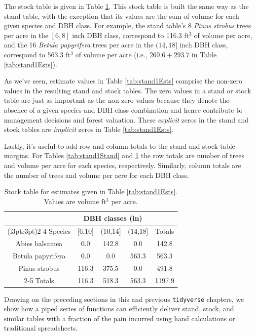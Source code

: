 \documentclass[
  11pt,
]{krantz}
\theoremstyle{definition}
\theoremstyle{definition}
\theoremstyle{definition}
\theoremstyle{definition}
\theoremstyle{remark}
\begin{document}
The stock table is given in Table \ref{tab:stand1Stock}. This stock table is built the same way as the stand table, with the exception that its values are the sum of volume for each given species and DBH class. For example, the stand table's 8 \emph{Pinus strobus} trees per acre in the \([6, 8]\) inch DBH class, correspond to 116.3 ft\(^3\) of volume per acre, and the 16 \emph{Betula papyrifera} trees per acre in the \((14, 18]\) inch DBH class, correspond to 563.3 ft\(^3\) of volume per acre (i.e., \(269.6+293.7\) in Table \ref{tab:stand1Ests}).

As we've seen, estimate values in Table \ref{tab:stand1Ests} comprise the non-zero values in the resulting stand and stock tables. The zero values in a stand or stock table are just as important as the non-zero values because they denote the absence of a given species and DBH class combination and hence contribute to management decisions and forest valuation. These \emph{explicit} zeros in the stand and stock tables are \emph{implicit} zeros in Table \ref{tab:stand1Ests}.

Lastly, it's useful to add row and column totals to the stand and stock table margins. For Tables \ref{tab:stand1Stand} and \ref{tab:stand1Stock} the row totals are number of trees and volume per acre for each species, respectively. Similarly, column totals are the number of trees and volume per acre for each DBH class.

\begin{table}[!h]

\caption{\label{tab:stand1Stock}Stock table for estimates given in Table \ref{tab:stand1Ests}. Values are volume ft$^3$ per acre.}
\centering
\begin{tabular}[t]{ccccc}
\toprule
\multicolumn{1}{c}{ } & \multicolumn{3}{c}{DBH classes (in)} & \multicolumn{1}{c}{ } \\
\cmidrule(l{3pt}r{3pt}){2-4}
Species & {}[6,10] & (10,14] & (14,18] & Totals\\
\midrule
Abies balsamea & 0.0 & 142.8 & 0.0 & 142.8\\
Betula papyrifera & 0.0 & 0.0 & 563.3 & 563.3\\
Pinus strobus & 116.3 & 375.5 & 0.0 & 491.8\\
\cline{2-5}
Totals & 116.3 & 518.3 & 563.3 & 1197.9\\
\bottomrule
\end{tabular}
\end{table}

Drawing on the preceding sections in this and previous \texttt{tidyverse} chapters, we show how a piped series of functions can efficiently deliver stand, stock, and similar tables with a fraction of the pain incurred using hand calculations or traditional spreadsheets.
\end{document}
